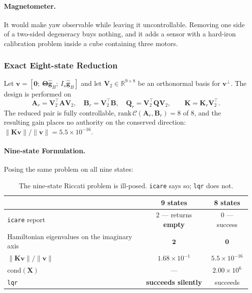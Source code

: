 \paragraph{Magnetometer.} It would make yaw observable while
leaving it uncontrollable. Removing one side of a two-sided degeneracy buys
nothing, and it adds a sensor with a hard-iron calibration problem inside a
cube containing three motors.

\subsubsection{Exact Eight-state Reduction}
\label{sec:reduction}

Let $\bm{v} = [\bm{0};\ \bm{\Theta}\hat{\bm{g}}_B;\ I_s\hat{\bm{g}}_B]$ and
let $\bm{V}_2 \in \mathbb{R}^{9\times8}$ be an orthonormal basis for
$\bm{v}^{\perp}$. The design is performed on
%
\begin{equation}
  \bm{A}_r = \bm{V}_2^{\top}\bm{A}\bm{V}_2, \quad
  \bm{B}_r = \bm{V}_2^{\top}\bm{B}, \quad
  \bm{Q}_r = \bm{V}_2^{\top}\bm{Q}\bm{V}_2,
  \qquad
  \bm{K} = \bm{K}_r\bm{V}_2^{\top}.
  \label{eq:reduction}
\end{equation}
%
The reduced pair is fully controllable, $\mathrm{rank}\,\mathcal{C}(\bm{A}_r,
\bm{B}_r) = 8$ of $8$, and the resulting gain places no authority on the
conserved direction: $\lVert\bm{K}\bm{v}\rVert/\lVert\bm{v}\rVert =
5.5\times10^{-16}$.

\paragraph{Nine-state Formulation.} Posing the same problem on all nine states:

\begin{table}[htbp]
\centering
\small
\begin{tabular}{@{}lcc@{}}
\toprule
 & \textbf{9 states} & \textbf{8 states}\\
\midrule
\texttt{icare} report & $2$ --- returns \textbf{empty} & $0$ --- success\\
Hamiltonian eigenvalues on the imaginary axis & $\bm{2}$ & $\bm{0}$\\
$\lVert\bm{K}\bm{v}\rVert/\lVert\bm{v}\rVert$ & $1.68\times10^{-1}$ & $5.5\times10^{-16}$\\
$\mathrm{cond}(\bm{X})$ & --- & $2.00\times10^{6}$\\
\texttt{lqr} & \textbf{succeeds silently} & succeeds\\
\bottomrule
\end{tabular}
\caption{The nine-state Riccati problem is ill-posed. \texttt{icare} says so;
\texttt{lqr} does not.}
\label{tab:riccati}
\end{table}

